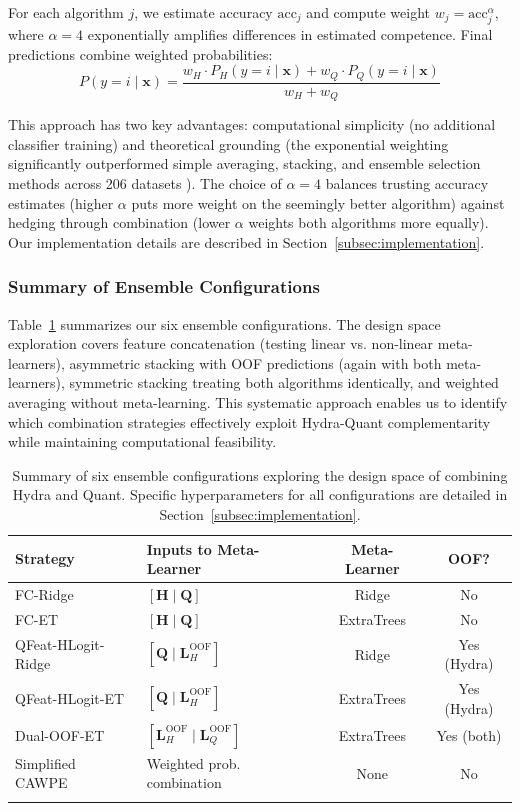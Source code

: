 \documentclass[pdflatex,sn-basic]{sn-jnl}           %
\theoremstyle{thmstyleone}%
\theoremstyle{thmstyletwo}%
\theoremstyle{thmstylethree}%
\begin{document}
For each algorithm $j$, we estimate accuracy $\text{acc}_j$ and compute weight $w_j = \text{acc}_j^\alpha$, where $\alpha=4$ exponentially amplifies differences in estimated competence. Final predictions combine weighted probabilities:
\begin{equation}
P(y=i \mid \mathbf{x}) = \frac{w_H \cdot P_H(y=i \mid \mathbf{x}) + w_Q \cdot P_Q(y=i \mid \mathbf{x})}{w_H + w_Q}
\end{equation}

This approach has two key advantages: computational simplicity (no additional classifier training) and theoretical grounding (the exponential weighting significantly outperformed simple averaging, stacking, and ensemble selection methods across 206 datasets \citep{cawpe}). The choice of $\alpha=4$ balances trusting accuracy estimates (higher $\alpha$ puts more weight on the seemingly better algorithm) against hedging through combination (lower $\alpha$ weights both algorithms more equally). Our implementation details are described in Section~\ref{subsec:implementation}.

\subsubsection{Summary of Ensemble Configurations}

Table~\ref{tab:ensemble_summary} summarizes our six ensemble configurations. The design space exploration covers feature concatenation (testing linear vs. non-linear meta-learners), asymmetric stacking with OOF predictions (again with both meta-learners), symmetric stacking treating both algorithms identically, and weighted averaging without meta-learning. This systematic approach enables us to identify which combination strategies effectively exploit Hydra-Quant complementarity while maintaining computational feasibility.

\begin{table}[h]
\centering
\caption{Summary of six ensemble configurations exploring the design space of combining Hydra and Quant. Specific hyperparameters for all configurations are detailed in Section~\ref{subsec:implementation}.}\label{tab:ensemble_summary}
\small
\begin{tabular}{llcc}
\toprule
\textbf{Strategy} & \textbf{Inputs to Meta-Learner} & \textbf{Meta-Learner} & \textbf{OOF?} \\
\midrule
FC-Ridge & $[\mathbf{H} \mid \mathbf{Q}]$ & Ridge & No \\
FC-ET & $[\mathbf{H} \mid \mathbf{Q}]$ & ExtraTrees & No \\
QFeat-HLogit-Ridge & $[\mathbf{Q} \mid \mathbf{L}_H^{\text{OOF}}]$ & Ridge & Yes (Hydra) \\
QFeat-HLogit-ET & $[\mathbf{Q} \mid \mathbf{L}_H^{\text{OOF}}]$ & ExtraTrees & Yes (Hydra) \\
Dual-OOF-ET & $[\mathbf{L}_H^{\text{OOF}} \mid \mathbf{L}_Q^{\text{OOF}}]$ & ExtraTrees & Yes (both) \\
Simplified CAWPE & Weighted prob. combination & None & No \\
\botrule
\end{tabular}
\end{table}
\end{document}
